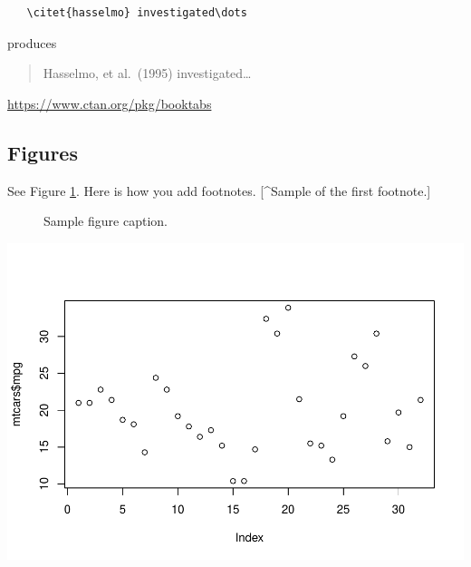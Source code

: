 \documentclass{article}
\newenvironment{Shaded}{\begin{snugshade}}{\end{snugshade}}
\newcommand{\FunctionTok}[1]{\textcolor[rgb]{0.00,0.00,0.00}{#1}}
\newcommand{\NormalTok}[1]{#1}
\newcommand{\SpecialCharTok}[1]{\textcolor[rgb]{0.00,0.00,0.00}{#1}}
\begin{document}
\begin{verbatim}
   \citet{hasselmo} investigated\dots
\end{verbatim}

produces

\begin{quote}
  Hasselmo, et al.\ (1995) investigated\dots
\end{quote}

\begin{center}
  \url{https://www.ctan.org/pkg/booktabs}
\end{center}

\hypertarget{figures}{%
\subsection{Figures}\label{figures}}

\lipsum[10] See Figure \ref{fig:fig1}. Here is how you add footnotes.
{[}\^{}Sample of the first footnote.{]}

\lipsum[11]

\begin{figure}
  \centering
  \fbox{\rule[-.5cm]{4cm}{4cm} \rule[-.5cm]{4cm}{0cm}}
  \caption{Sample figure caption.}
  \label{fig:fig1}
\end{figure}

\begin{Shaded}
\end{Shaded}

\includegraphics{paper_files/figure-latex/unnamed-chunk-11-1.pdf}
\end{document}
